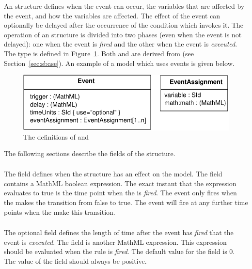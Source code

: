 \documentclass[10pt,twocolumntoc]{cekarticle}
\newcommand{\vref}[1]{\ref{#1}}
\begin{document}
An  structure defines when the event can occur, the variables
that are affected by the event, and how the variables are affected.  The
effect of the event can optionally be delayed after the occurrence of the
condition which invokes it.  The operation of an  structure is
divided into two phases (even when the event is not delayed): one when the
event is \emph{fired} and the other when the event is \emph{executed}. The
 type is defined in Figure~\vref{fig:event}.  Both
 and  are derived from 
(see Section~\ref{sec:sbase}).  An example of a model which uses events is
given below.

\begin{figure}[htb]
  \centering
  \includegraphics[scale = 0.68]{event}
  \caption{The definitions of  and }
  \label{fig:event}
\end{figure}

The following sections describe the fields of the 
structure.

\subsubsection{}
The  field defines when the 
structure has an effect on the model.  The  field
contains a MathML boolean expression.  The exact instant that the
expression evaluates to true is the time point when the
 is \emph{fired}.  The event only fires when the
 makes the transition from false to true.  The
event will fire at any further time points when the
 make this transition.

\subsubsection{}
The optional  field defines the length of time after
the event has \emph{fired} that the event is \emph{executed}. The
 field is another MathML expression.  This
expression should be evaluated when the rule is \emph{fired}.  The
default value for the  field is 0.  The value of the
 field should always be positive.
\end{document}
